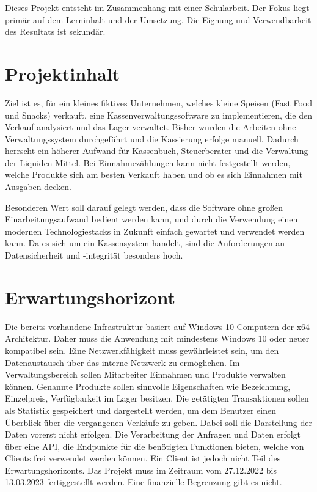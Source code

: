 Dieses Projekt entsteht im Zusammenhang mit einer Schularbeit. Der Fokus liegt primär auf dem Lerninhalt und der Umsetzung. Die Eignung und Verwendbarkeit des Resultats ist sekundär.

\section{Projektinhalt}
Ziel ist es, für ein kleines fiktives Unternehmen, welches kleine Speisen (Fast Food und Snacks) verkauft, eine Kassenverwaltungssoftware zu implementieren, die den Verkauf analysiert und das Lager verwaltet.
Bisher wurden die Arbeiten ohne Verwaltungssystem durchgeführt und die Kassierung erfolge manuell.
Dadurch herrscht ein höherer Aufwand für Kassenbuch, Steuerberater und die Verwaltung der Liquiden Mittel.
Bei Einnahmezählungen kann nicht festgestellt werden, welche Produkte sich am besten Verkauft haben und ob es sich Einnahmen mit Ausgaben decken.

Besonderen Wert soll darauf gelegt werden, dass die Software ohne großen Einarbeitungsaufwand bedient werden kann, und durch die Verwendung einen modernen Technologiestacks in Zukunft einfach gewartet und verwendet werden kann.
Da es sich um ein Kassensystem handelt, sind die Anforderungen an Datensicherheit und -integrität besonders hoch.

\section{Erwartungshorizont}
Die bereits vorhandene Infrastruktur basiert auf Windows 10 Computern der x64-Architektur.
Daher muss die Anwendung mit mindestens Windows 10 oder neuer kompatibel sein.
Eine Netzwerkfähigkeit muss gewährleistet sein, um den Datenaustausch über das interne Netzwerk zu ermöglichen.
Im Verwaltungsbereich sollen Mitarbeiter Einnahmen und Produkte verwalten können.
Genannte Produkte sollen sinnvolle Eigenschaften wie Bezeichnung, Einzelpreis, Verfügbarkeit im Lager besitzen.
Die getätigten Transaktionen sollen als Statistik gespeichert und dargestellt werden, um dem Benutzer einen Überblick über die vergangenen Verkäufe zu geben.
Dabei soll die Darstellung der Daten vorerst nicht erfolgen.
Die Verarbeitung der Anfragen und Daten erfolgt über eine API, die Endpunkte für die benötigten Funktionen bieten, welche von Clients frei verwendet werden können.
Ein Client ist jedoch nicht Teil des Erwartungshorizonts.
Das Projekt muss im Zeitraum vom 27.12.2022 bis 13.03.2023 fertiggestellt werden.
Eine finanzielle Begrenzung gibt es nicht.